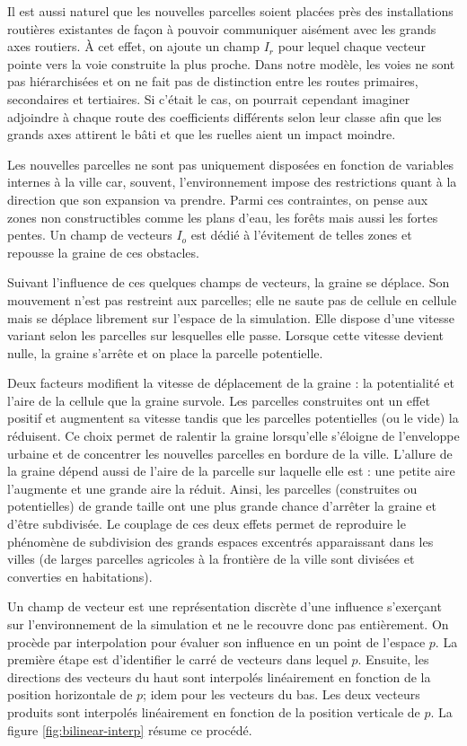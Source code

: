 \documentclass[12pt]{article}
\begin{document}
Il est aussi naturel que les nouvelles parcelles soient placées près
des installations routières existantes de façon à pouvoir communiquer
aisément avec les grands axes routiers. À cet effet, on ajoute un
champ $I_r$ pour lequel chaque vecteur pointe vers la voie construite
la plus proche. Dans notre modèle, les voies ne sont pas hiérarchisées
et on ne fait pas de distinction entre les routes primaires,
secondaires et tertiaires. Si c'était le cas, on pourrait cependant
imaginer adjoindre à chaque route des coefficients différents selon
leur classe afin que les grands axes attirent le bâti et que les
ruelles aient un impact moindre.

Les nouvelles parcelles ne sont pas uniquement disposées en fonction
de variables internes à la ville car, souvent, l'environnement impose
des restrictions quant à la direction que son expansion va
prendre. Parmi ces contraintes, on pense aux zones non constructibles
comme les plans d'eau, les forêts mais aussi les fortes pentes. Un
champ de vecteurs $I_o$ est dédié à l'évitement de telles zones et
repousse la graine de ces obstacles.

Suivant l'influence de ces quelques champs de vecteurs, la graine se
déplace. Son mouvement n'est pas restreint aux parcelles; elle ne
saute pas de cellule en cellule mais se déplace librement sur l'espace
de la simulation. Elle dispose d'une vitesse variant selon les
parcelles sur lesquelles elle passe. Lorsque cette vitesse devient
nulle, la graine s'arrête et on place la parcelle potentielle.

Deux facteurs modifient la vitesse de déplacement de la graine : la
potentialité et l'aire de la cellule que la graine survole. Les
parcelles construites ont un effet positif et augmentent sa vitesse
tandis que les parcelles potentielles (ou le vide) la réduisent. Ce
choix permet de ralentir la graine lorsqu'elle s'éloigne de
l'enveloppe urbaine et de concentrer les nouvelles parcelles en
bordure de la ville. L'allure de la graine dépend aussi de l'aire de
la parcelle sur laquelle elle est : une petite aire l'augmente et une
grande aire la réduit. Ainsi, les parcelles (construites ou
potentielles) de grande taille ont une plus grande chance d'arrêter la
graine et d'être subdivisée. Le couplage de ces deux effets permet de
reproduire le phénomène de subdivision des grands espaces excentrés
apparaissant dans les villes (de larges parcelles agricoles à la
frontière de la ville sont divisées et converties en habitations).

Un champ de vecteur est une représentation discrète d'une influence
s'exerçant sur l'environnement de la simulation et ne le recouvre donc
pas entièrement. On procède par interpolation pour évaluer son
influence en un point de l'espace $p$. La première étape est
d'identifier le carré de vecteurs dans lequel $p$. Ensuite, les
directions des vecteurs du haut sont interpolés linéairement en
fonction de la position horizontale de $p$; idem pour les vecteurs du
bas. Les deux vecteurs produits sont interpolés linéairement en
fonction de la position verticale de $p$. La figure
\ref{fig:bilinear-interp} résume ce procédé.
\end{document}
